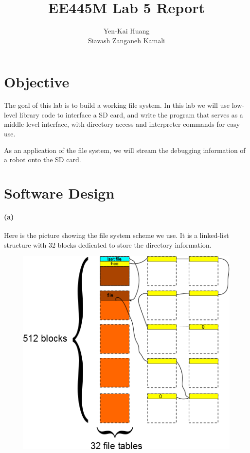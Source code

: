 \documentclass[a4paper]{article}
\newlength{\pic}
\begin{document}
\title{EE445M Lab 5 Report}
\author{Yen-Kai Huang \\ Siavash Zanganeh Kamali}
\maketitle

\section{Objective} The goal of this lab is to build a working file system. In this lab we will use
low-level library code to interface a SD card, and write the program that serves as a middle-level interface,
with directory access and interpreter commands for easy use. 

As an application of the file system, we will stream the debugging information of a robot onto the SD card.

\section{Software Design} 

\paragraph{(a)} Here is the picture showing the file system scheme we use. It is a linked-list structure
with 32 blocks dedicated to store the directory information.

\setlength{\pic}{0.5\textwidth}
\begin{figure}[htp]
\center
\includegraphics[width=\pic]{drawing}
\end{figure}
\end{document}
